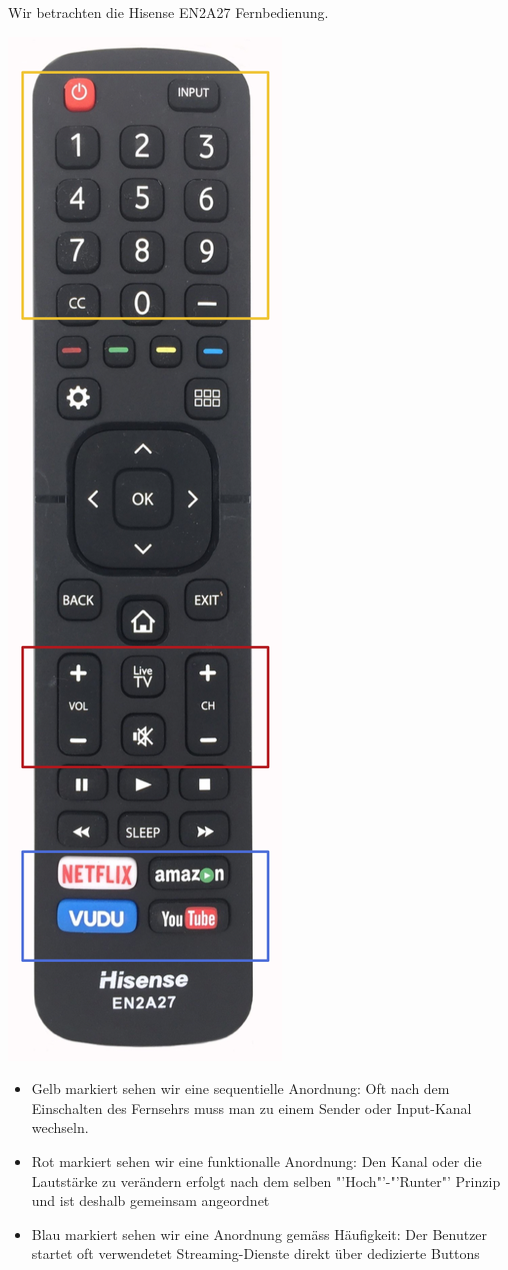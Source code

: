 \graphicspath{ {../images/} } 

Wir betrachten die Hisense EN2A27 Fernbedienung. 

\includegraphics[scale=.5]{remote}

\begin{itemize}
  \item Gelb markiert sehen wir eine sequentielle Anordnung: Oft nach dem Einschalten des
        Fernsehrs muss man zu einem Sender oder Input-Kanal wechseln.
  \item Rot markiert sehen wir eine funktionalle Anordnung: Den Kanal oder die
    Lautstärke zu verändern erfolgt nach dem selben "'Hoch"'-"'Runter"' Prinzip
    und ist deshalb gemeinsam angeordnet
  \item Blau markiert sehen wir eine Anordnung gemäss Häufigkeit: Der Benutzer
    startet oft verwendetet Streaming-Dienste direkt über dedizierte Buttons
\end{itemize}
